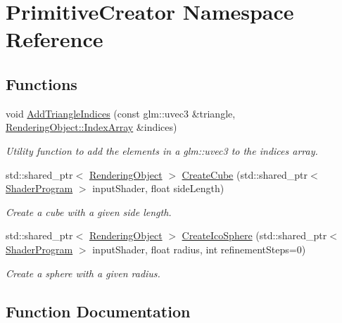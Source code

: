 \hypertarget{namespace_primitive_creator}{}\section{Primitive\+Creator Namespace Reference}
\label{namespace_primitive_creator}
\subsection*{Functions}
\begin{DoxyCompactItemize}
\item 
void \hyperlink{namespace_primitive_creator_acbc473c3e4d3b99d8e2b9d302e095978}{Add\+Triangle\+Indices} (const glm\+::uvec3 \&triangle, \hyperlink{class_rendering_object_a9931c88bca3384065c6691dfe1e60af1}{Rendering\+Object\+::\+Index\+Array} \&indices)
\begin{DoxyCompactList}\small\item\em Utility function to add the elements in a glm\+::uvec3 to the indices array. \end{DoxyCompactList}\item 
std\+::shared\+\_\+ptr$<$ \hyperlink{class_rendering_object}{Rendering\+Object} $>$ \hyperlink{namespace_primitive_creator_a4fcaafc02f9b75b4e6e9720e7c15c079}{Create\+Cube} (std\+::shared\+\_\+ptr$<$ \hyperlink{class_shader_program}{Shader\+Program} $>$ input\+Shader, float side\+Length)
\begin{DoxyCompactList}\small\item\em Create a cube with a given side length. \end{DoxyCompactList}\item 
std\+::shared\+\_\+ptr$<$ \hyperlink{class_rendering_object}{Rendering\+Object} $>$ \hyperlink{namespace_primitive_creator_afbeed51ca2c797399acd7b582ce91139}{Create\+Ico\+Sphere} (std\+::shared\+\_\+ptr$<$ \hyperlink{class_shader_program}{Shader\+Program} $>$ input\+Shader, float radius, int refinement\+Steps=0)
\begin{DoxyCompactList}\small\item\em Create a sphere with a given radius. \end{DoxyCompactList}\end{DoxyCompactItemize}


\subsection{Function Documentation}
\hypertarget{namespace_primitive_creator_acbc473c3e4d3b99d8e2b9d302e095978}{}

